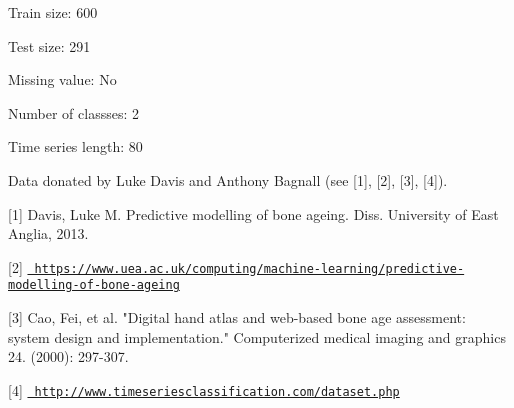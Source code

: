 Train size\+: 600

Test size\+: 291

Missing value\+: No

Number of classses\+: 2

Time series length\+: 80

Data donated by Luke Davis and Anthony Bagnall (see \mbox{[}1\mbox{]}, \mbox{[}2\mbox{]}, \mbox{[}3\mbox{]}, \mbox{[}4\mbox{]}).

\mbox{[}1\mbox{]} Davis, Luke M. Predictive modelling of bone ageing. Diss. University of East Anglia, 2013.

\mbox{[}2\mbox{]} \href{https://www.uea.ac.uk/computing/machine-learning/predictive-modelling-of-bone-ageing}{\texttt{ https\+://www.\+uea.\+ac.\+uk/computing/machine-\/learning/predictive-\/modelling-\/of-\/bone-\/ageing}}

\mbox{[}3\mbox{]} Cao, Fei, et al. "{}\+Digital hand atlas and web-\/based bone age assessment\+: system design and implementation."{} Computerized medical imaging and graphics 24. (2000)\+: 297-\/307.

\mbox{[}4\mbox{]} \href{http://www.timeseriesclassification.com/dataset.php}{\texttt{ http\+://www.\+timeseriesclassification.\+com/dataset.\+php}} 